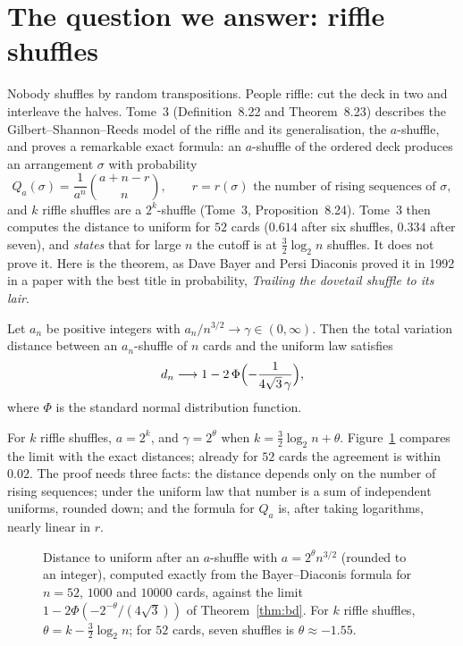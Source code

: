 \section{The question we answer: riffle shuffles}

Nobody shuffles by random transpositions. People riffle: cut the deck in two and interleave the halves. Tome~3 (Definition~8.22 and
Theorem~8.23) describes the Gilbert--Shannon--Reeds model of the riffle and its generalisation, the $a$-shuffle, and proves a
remarkable exact formula: an $a$-shuffle of the ordered deck produces an arrangement $\sigma$ with probability
\[
Q_a(\sigma)=\frac1{a^n}\binom{a+n-r}n,\qquad r=r(\sigma)\text{ the number of rising sequences of }\sigma,
\]
and $k$ riffle shuffles are a $2^k$-shuffle (Tome~3, Proposition~8.24). Tome~3 then computes the distance to uniform for $52$ cards ($0.614$ after six
shuffles, $0.334$ after seven), and \emph{states} that for large $n$ the cutoff is at $\frac32\log_2n$ shuffles. It does not prove it. Here is the
theorem, as Dave Bayer and Persi Diaconis proved it in 1992 in a paper with the best title in probability, \emph{Trailing the dovetail shuffle
to its lair}.

\begin{theorem}\label{thm:bd}
Let $a_n$ be positive integers with $a_n/n^{3/2}\to\gamma\in(0,\infty)$. Then the total variation distance between an $a_n$-shuffle of $n$ cards and the
uniform law satisfies
\[
d_n\longrightarrow1-2\,\Phi\Bigl(-\frac1{4\sqrt3\,\gamma}\Bigr),
\]
where $\Phi$ is the standard normal distribution function.
\end{theorem}

For $k$ riffle shuffles, $a=2^k$, and $\gamma=2^\theta$ when $k=\frac32\log_2n+\theta$. Figure~\ref{fig:riffle15} compares the limit with the exact distances; already for $52$
cards the agreement is within $0.02$. The proof needs three facts: the distance depends only on the number of rising sequences; under the
uniform law that number is a sum of independent uniforms, rounded down; and the formula for $Q_a$ is, after taking logarithms, nearly linear in $r$.

\begin{figure}[ht]
\centering
{}
\caption{Distance to uniform after an $a$-shuffle with $a=2^\theta n^{3/2}$ (rounded to an integer), computed exactly from the Bayer--Diaconis formula for $n=52$,
$1000$ and $10000$ cards, against the limit $1-2\Phi(-2^{-\theta}/(4\sqrt3))$ of Theorem~\ref{thm:bd}. For $k$ riffle shuffles, $\theta=k-\frac32\log_2n$; for $52$ cards,
seven shuffles is $\theta\approx-1.55$.}
\label{fig:riffle15}
\end{figure}

